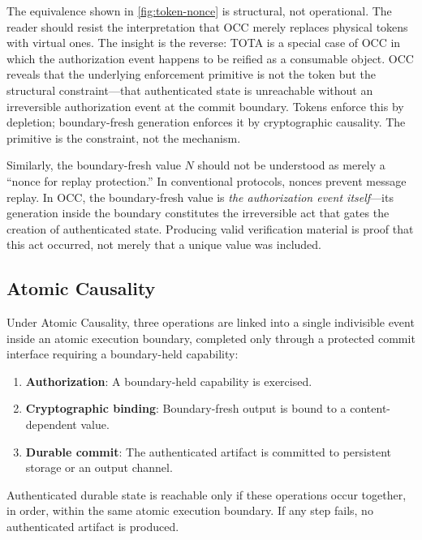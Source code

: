 \documentclass[11pt,letterpaper]{article}
\theoremstyle{occplain}
\theoremstyle{occremark}
\begin{document}
The equivalence shown in \cref{fig:token-nonce} is structural, not operational. The reader should resist the interpretation that OCC merely replaces physical tokens with virtual ones. The insight is the reverse: TOTA is a special case of OCC in which the authorization event happens to be reified as a consumable object. OCC reveals that the underlying enforcement primitive is not the token but the structural constraint---that authenticated state is unreachable without an irreversible authorization event at the commit boundary. Tokens enforce this by depletion; boundary-fresh generation enforces it by cryptographic causality. The primitive is the constraint, not the mechanism.

Similarly, the boundary-fresh value $N$ should not be understood as merely a ``nonce for replay protection.'' In conventional protocols, nonces prevent message replay. In OCC, the boundary-fresh value is \emph{the authorization event itself}---its generation inside the boundary constitutes the irreversible act that gates the creation of authenticated state. Producing valid verification material is proof that this act occurred, not merely that a unique value was included.


\subsection{Atomic Causality}
\label{sec:atomic-causality}

Under Atomic Causality, three operations are linked into a single indivisible event inside an atomic execution boundary, completed only through a protected commit interface requiring a boundary-held capability:
\begin{enumerate}
  \item \textbf{Authorization}: A boundary-held capability is exercised.
  \item \textbf{Cryptographic binding}: Boundary-fresh output is bound to a content-dependent value.
  \item \textbf{Durable commit}: The authenticated artifact is committed to persistent storage or an output channel.
\end{enumerate}

Authenticated durable state is reachable only if these operations occur together, in order, within the same atomic execution boundary. If any step fails, no authenticated artifact is produced.
\end{document}
